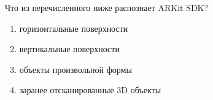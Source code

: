 
Что из перечисленного ниже распознает ARKit SDK?

\begin{enumerate}
    \item горизонтальные поверхности
    \item вертикальные поверхности
    \item объекты произвольной формы
    \item заранее отсканированные 3D объекты
\end{enumerate}